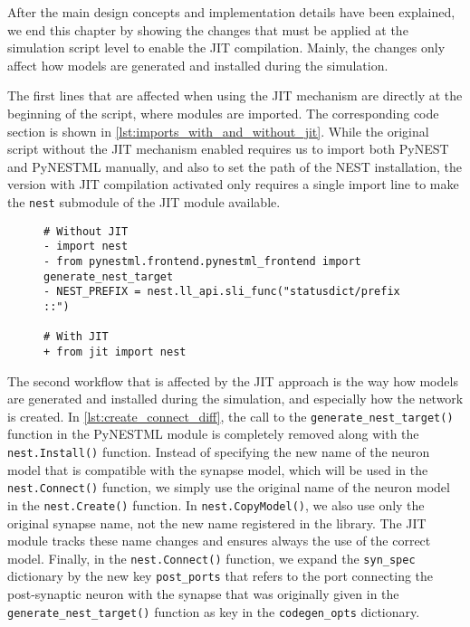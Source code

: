 After the main design concepts and implementation details have been explained, we end this chapter by showing the changes that must be applied at the simulation script level to enable the JIT compilation. Mainly, the changes only affect how models are generated and installed during the simulation.

The first lines that are affected when using the JIT mechanism are directly at the beginning of the script, where modules are imported. The corresponding code section is shown in \autoref{lst:imports_with_and_without_jit}. While the original script without the JIT mechanism enabled requires us to import both PyNEST and PyNESTML manually, and also to set the path of the NEST installation, the version with JIT compilation activated only requires a single import line to make the \texttt{nest} submodule of the JIT module available.

\begin{figure}[ht!]
\centering
\begin{lstlisting}[language=Pydiff, label=lst:imports_with_and_without_jit, caption={The simulation script imports with and without the JIT mechanism enabled. Lines that are necessary without the JIT module are shown in red, lines in the new version are shown in green.}]
# Without JIT
- import nest
- from pynestml.frontend.pynestml_frontend import generate_nest_target
- NEST_PREFIX = nest.ll_api.sli_func("statusdict/prefix ::")

# With JIT
+ from jit import nest

\end{lstlisting}
\end{figure}


The second workflow that is affected by the JIT approach is the way how models are generated and installed during the simulation, and especially how the network is created. In \autoref{lst:create_connect_diff}, the call to the \texttt{generate\_nest\_target()} function in the PyNESTML module is completely removed along with the \texttt{nest.Install()} function. Instead of specifying the new name of the neuron model that is compatible with the synapse model, which will be used in the \texttt{nest.Connect()} function, we simply use the original name of the neuron model in the \texttt{nest.Create()} function. In \texttt{nest.CopyModel()}, we also use only the original synapse name, not the new name registered in the library. The JIT module tracks these name changes and ensures always the use of the correct model. Finally, in the \texttt{nest.Connect()} function, we expand the \texttt{syn\_spec} dictionary by the new key \texttt{post\_ports} that refers to the port connecting the post-synaptic neuron with the synapse that was originally given in the \texttt{generate\_nest\_target()} function as key in the \texttt{codegen\_opts} dictionary.


